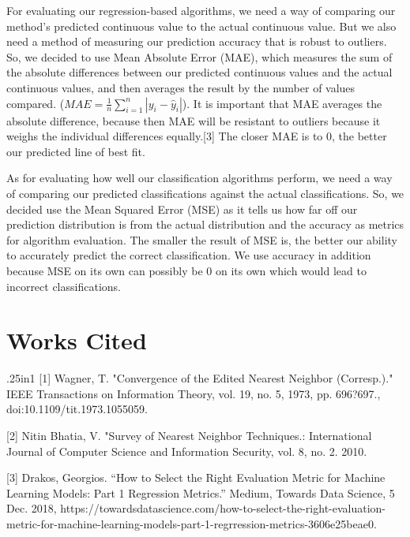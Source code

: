 \documentclass{article}
\begin{document}
For evaluating our regression-based algorithms, we need a way of comparing our method's predicted continuous value to the actual continuous value. But we also need a method of measuring our prediction accuracy that is robust to outliers. So, we decided to use Mean Absolute Error (MAE), which measures the sum of the absolute differences between our predicted continuous values and the actual continuous values, and then averages the result by the number of values compared. ($MAE = \frac{1}{n} \sum_{i=1}^n | y_i - \hat{y}_i|$). It is important that MAE averages the absolute difference, because then MAE will be resistant to outliers because it weighs the individual differences equally.[3] The closer MAE is to 0, the better our predicted line of best fit.

As for evaluating how well our classification algorithms perform, we need a way of comparing our predicted classifications against the actual classifications. So, we decided use the Mean Squared Error (MSE) as it tells us how far off our prediction distribution is from the actual distribution and the accuracy as metrics for algorithm evaluation. The smaller the result of MSE is, the better our ability to accurately predict the correct classification.  We use accuracy in addition because MSE on its own can possibly be 0 on its own which would lead to incorrect classifications.


\section{Works Cited}
\begin{hangparas}{.25in}{1}
[1] Wagner, T. "Convergence of the Edited Nearest Neighbor (Corresp.)." IEEE Transactions on Information Theory, vol. 19, no. 5, 1973, pp. 696?697., doi:10.1109/tit.1973.1055059.

[2] Nitin Bhatia, V. "Survey of Nearest Neighbor Techniques.: International Journal of Computer Science and Information Security, vol. 8, no. 2. 2010.

[3] Drakos, Georgios. “How to Select the Right Evaluation Metric for Machine Learning Models: Part 1 Regression Metrics.” Medium, Towards Data Science, 5 Dec. 2018, https://towardsdatascience.com/how-to-select-the-right-evaluation-metric-for-machine-learning-models-part-1-regrression-metrics-3606e25beae0.
\end{hangparas}
\end{document}
